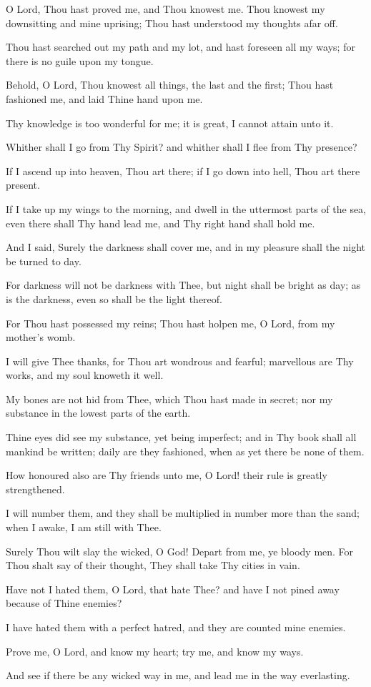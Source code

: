 O Lord, Thou hast proved me, and Thou knowest me. Thou knowest my downsitting and mine uprising; Thou hast understood my thoughts afar off.

Thou hast searched out my path and my lot, and hast foreseen all my ways; for there is no guile upon my tongue.

Behold, O Lord, Thou knowest all things, the last and the first; Thou hast fashioned me, and laid Thine hand upon me.

Thy knowledge is too wonderful for me; it is great, I cannot attain unto it.

Whither shall I go from Thy Spirit? and whither shall I flee from Thy presence?

If I ascend up into heaven, Thou art there; if I go down into hell, Thou art there present.

If I take up my wings to the morning, and dwell in the uttermost parts of the sea, even there shall Thy hand lead me, and Thy right hand shall hold me.

And I said, Surely the darkness shall cover me, and in my pleasure shall the night be turned to day.

For darkness will not be darkness with Thee, but night shall be bright as day; as is the darkness, even so shall be the light thereof.

For Thou hast possessed my reins; Thou hast holpen me, O Lord, from my mother's womb.

I will give Thee thanks, for Thou art wondrous and fearful; marvellous are Thy works, and my soul knoweth it well.

My bones are not hid from Thee, which Thou hast made in secret; nor my substance in the lowest parts of the earth.

Thine eyes did see my substance, yet being imperfect; and in Thy book shall all mankind be written; daily are they fashioned, when as yet there be none of them.

How honoured also are Thy friends unto me, O Lord! their rule is greatly strengthened.

I will number them, and they shall be multiplied in number more than the sand; when I awake, I am still with Thee.

Surely Thou wilt slay the wicked, O God! Depart from me, ye bloody men. For Thou shalt say of their thought, They shall take Thy cities in vain.

Have not I hated them, O Lord, that hate Thee? and have I not pined away because of Thine enemies?

I have hated them with a perfect hatred, and they are counted mine enemies.

Prove me, O Lord, and know my heart; try me, and know my ways.

And see if there be any wicked way in me, and lead me in the way everlasting.
